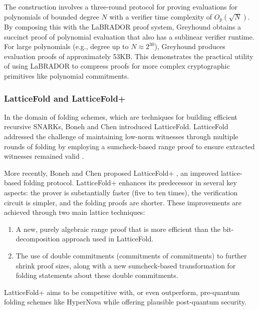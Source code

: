 The construction involves a three-round protocol for proving evaluations for
polynomials of bounded degree $N$ with a verifier time complexity of
$O_p(\sqrt{N})$. By composing this with the LaBRADOR proof system, Greyhound
obtains a succinct proof of polynomial evaluation that also has a sublinear
verifier runtime. For large polynomials (e.g., degree up to $N \approx
2^{30}$), Greyhound produces evaluation proofs of approximately 53KB. This
demonstrates the practical utility of using LaBRADOR to compress proofs for
more complex cryptographic primitives like polynomial commitments.

\subsubsection{LatticeFold and LatticeFold+}

In the domain of folding schemes, which are techniques for building efficient
recursive SNARKs, Boneh and Chen introduced LatticeFold. LatticeFold addressed
the challenge of maintaining low-norm witnesses through multiple rounds of
folding by employing a sumcheck-based range proof to ensure extracted
witnesses remained valid \cite{LatticeFold}.

More recently, Boneh and Chen proposed LatticeFold+
\cite{LatticeFoldPlus}, an improved lattice-based folding protocol.
LatticeFold+ enhances its predecessor in several key aspects: the prover is
substantially faster (five to ten times), the verification circuit is simpler,
and the folding proofs are shorter. These improvements are achieved through
two main lattice techniques:

\begin{enumerate}
    \item A new, purely algebraic range proof that is more efficient than the
		bit-decomposition approach used in LatticeFold.
    \item The use of double commitments (commitments of commitments) to
		further shrink proof sizes, along with a new sumcheck-based
		transformation for folding statements about these double commitments.
\end{enumerate}

LatticeFold+ aims to be competitive with, or even outperform, pre-quantum
folding schemes like HyperNova \cite{HyperNova} while offering plausible post-quantum security.

